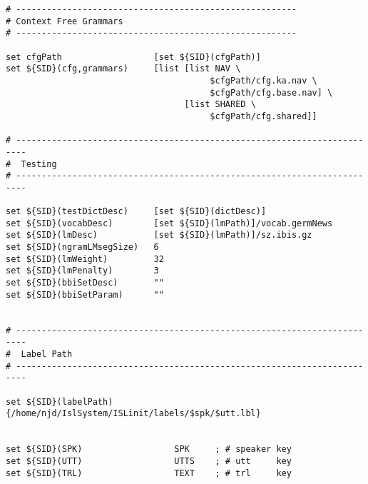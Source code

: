 {\begin{verbatim}
# -------------------------------------------------------
# Context Free Grammars
# -------------------------------------------------------

set cfgPath                  [set ${SID}(cfgPath)]
set ${SID}(cfg,grammars)     [list [list NAV \
                                        $cfgPath/cfg.ka.nav \
                                        $cfgPath/cfg.base.nav] \
                                   [list SHARED \
                                        $cfgPath/cfg.shared]]

# ------------------------------------------------------------------------
#  Testing 
# ------------------------------------------------------------------------

set ${SID}(testDictDesc)     [set ${SID}(dictDesc)]
set ${SID}(vocabDesc)        [set ${SID}(lmPath)]/vocab.germNews
set ${SID}(lmDesc)           [set ${SID}(lmPath)]/sz.ibis.gz
set ${SID}(ngramLMsegSize)   6
set ${SID}(lmWeight)         32
set ${SID}(lmPenalty)        3
set ${SID}(bbiSetDesc)       ""
set ${SID}(bbiSetParam)      ""


# ------------------------------------------------------------------------
#  Label Path
# ------------------------------------------------------------------------
 
set ${SID}(labelPath)     {/home/njd/IslSystem/ISLinit/labels/$spk/$utt.lbl}


set ${SID}(SPK)                  SPK     ; # speaker key
set ${SID}(UTT)                  UTTS    ; # utt     key
set ${SID}(TRL)                  TEXT    ; # trl     key
\end{verbatim}
}
